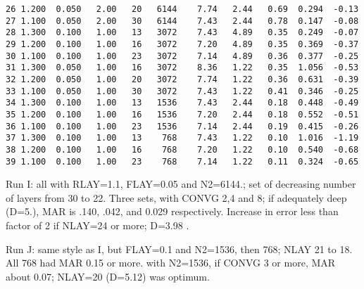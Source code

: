 \documentclass{article}
\begin{document}
\begin{table}
\begin{verbatim}
26 1.200  0.050   2.00   20   6144    7.74   2.44   0.69  0.294  -0.13
27 1.100  0.050   2.00   30   6144    7.43   2.44   0.78  0.147  -0.08
28 1.300  0.100   1.00   13   3072    7.43   4.89   0.35  0.249  -0.07
29 1.200  0.100   1.00   16   3072    7.20   4.89   0.35  0.369  -0.37
30 1.100  0.100   1.00   23   3072    7.14   4.89   0.36  0.377  -0.25
31 1.300  0.050   1.00   16   3072    8.36   1.22   0.35  1.056  -0.53
32 1.200  0.050   1.00   20   3072    7.74   1.22   0.36  0.631  -0.39
33 1.100  0.050   1.00   30   3072    7.43   1.22   0.41  0.346  -0.25
34 1.300  0.100   1.00   13   1536    7.43   2.44   0.18  0.448  -0.49
35 1.200  0.100   1.00   16   1536    7.20   2.44   0.18  0.552  -0.51
36 1.100  0.100   1.00   23   1536    7.14   2.44   0.19  0.415  -0.26
37 1.300  0.100   1.00   13    768    7.43   1.22   0.10  1.016  -1.19
38 1.200  0.100   1.00   16    768    7.20   1.22   0.10  0.540  -0.68
39 1.100  0.100   1.00   23    768    7.14   1.22   0.11  0.324  -0.65
\end{verbatim}
\vspace{-3.0mm}
\hrulefill \end{table} 

Run I: all with RLAY=1.1, FLAY=0.05 and N2=6144.; set of decreasing number of layers from 30 to 22. Three sets, with CONVG 2,4 and 8; if adequately deep (D=5.), MAR is .140, .042, and  0.029 respectively. Increase in error less than factor of 2 if NLAY=24 or more; D=3.98 .  


Run J: same style as I, but FLAY=0.1 and N2=1536, then 768; NLAY 21 to 18.
All 768 had MAR 0.15 or more. with N2=1536, if CONVG 3 or more, MAR about 0.07; NLAY=20 (D=5.12) was optimum.
\end{document}
